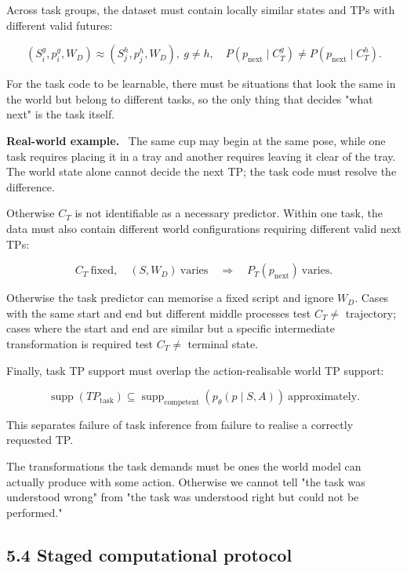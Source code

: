 \documentclass[11pt]{article}
\newenvironment{plainword}{%
  \par\medskip\noindent\begin{minipage}{\textwidth}%
  \color{gray!75!black}\small\itshape
}{%
  \end{minipage}\par\medskip}
\newenvironment{example}{%
  \par\smallskip\noindent\begin{minipage}{\textwidth}%
  \color{teal!60!black}\small
  \textbf{\color{teal!70!black}Real-world example.}\
}{%
  \end{minipage}\par\smallskip}
\begin{document}
Across task groups, the dataset must contain locally similar states and TPs with different valid futures:

\[
\boxed{
(S_i^g,p_i^g,W_D)\approx(S_j^h,p_j^h,W_D),\ g\neq h,
\quad
P(p_{\mathrm{next}}\mid C_T^g)
\neq P(p_{\mathrm{next}}\mid C_T^h).}
\]

\begin{plainword}
For the task code to be learnable, there must be situations that look the same in the world but belong to different tasks, so the
only thing that decides "what next" is the task itself.
\end{plainword}

\begin{example}
The same cup may begin at the same pose, while one task requires placing it in a tray and another requires leaving it clear of the
tray. The world state alone cannot decide the next TP; the task code must resolve the difference.
\end{example}

Otherwise $C_T$ is not identifiable as a necessary predictor. Within one task, the data must also contain different world
configurations requiring different valid next TPs:

\[
\boxed{
C_T\ \text{fixed},\quad (S,W_D)\ \text{varies}
\quad\Rightarrow\quad
P_T(p_{\mathrm{next}})\ \text{varies}.}
\]

Otherwise the task predictor can memorise a fixed script and ignore $W_D$. Cases with the same start and end but different middle
processes test $C_T\neq$ trajectory; cases where the start and end are similar but a specific intermediate transformation is
required test $C_T\neq$ terminal state.

Finally, task TP support must overlap the action-realisable world TP support:

\[
\boxed{
\operatorname{supp}(TP_{\mathrm{task}})
\subseteq\operatorname{supp}_{\mathrm{competent}}(p_\theta(p\mid S,A))
\ \text{approximately}.}
\]

This separates failure of task inference from failure to realise a correctly requested TP.

\begin{plainword}
The transformations the task demands must be ones the world model can actually produce with some action. Otherwise we cannot tell
"the task was understood wrong" from "the task was understood right but could not be performed."
\end{plainword}

\subsection*{5.4 Staged computational protocol}
\end{document}
